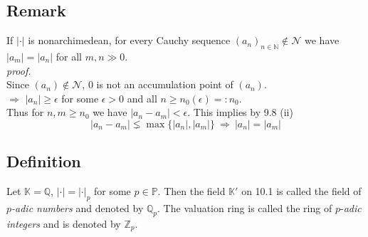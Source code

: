 \documentclass[12pt]{book}
\begin{document}
\begin{spacing}{1.3}
\subsection{Remark}%
If $|\cdot|$ is nonarchimedean, for every Cauchy sequence $(a_n)_{n \in \mathbb{N}} \notin \mathcal{N}$ we have $|a_m|=|a_n|$ for all $m,n \gg 0.$
\pagebreak\\
\textit{proof.}\\
Since $(a_n) \notin \mathcal{N}$, $0$ is not an accumulation point of $(a_n)$.\\
$\Longrightarrow$ $|a_n| \geqslant \epsilon$ for some $\epsilon >0$ and all $n \geqslant n_0(\epsilon)=:n_0$.\\
Thus for $n,m \geqslant n_0$ we have $|a_n-a_m| < \epsilon$. This implies by 9.8 (ii)
$$|a_n-a_m| \lneq \max\{|a_n|, |a_m|\} \ \Longrightarrow \ |a_n|=|a_m|$$

\subsection{Definition}%
Let $\mathbb{K}=\mathbb{Q}$, $|\cdot|=|\cdot|_p$ for some $p \in \mathbb{P}$. Then the field $\mathbb{K}'$ on 10.1 is called the field of $p$\textit{-adic numbers} and denoted by $\mathbb{Q}_p$. The valuation ring is called the ring of $p$-\textit{adic integers} and is denoted by $\mathbb{Z}_p$.


\end{spacing}
\end{document}
